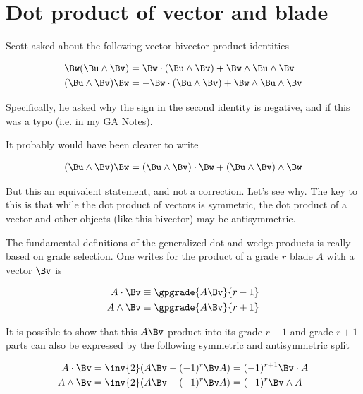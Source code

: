 

\chapter{Dot product of vector and blade}
\label{chap:dotBlade}
{}
\date{Aug 11, 2009}

\beginArtWithToc

Scott asked about the following vector bivector product identities

\begin{align}
\Bw (\Bu \wedge \Bv) &= \Bw \cdot (\Bu \wedge \Bv) + \Bw \wedge \Bu \wedge \Bv \\
(\Bu \wedge \Bv) \Bw &= - \Bw \cdot (\Bu \wedge \Bv) + \Bw \wedge \Bu \wedge \Bv
\end{align}

Specifically, he asked why the sign in the second identity is negative, and if this was a typo (\href{http://sites.google.com/site/peeterjoot/math2009/gabook.pdf}{i.e. in my GA Notes}).

It probably would have been clearer to write

\begin{align*}
(\Bu \wedge \Bv) \Bw = (\Bu \wedge \Bv) \cdot \Bw + (\Bu \wedge \Bv) \wedge \Bw
\end{align*}

But this an equivalent statement, and not a correction.  Let's see why.  The key to this is that while the dot product of vectors is symmetric, the dot product of a vector and other objects (like this bivector) may be antisymmetric.

The fundamental definitions of the generalized dot and wedge products is really based on grade selection.  One writes for the product of a grade $r$ blade $A$ with a vector $\Bv$ is

\begin{align}\label{eqn:foo4}
A \cdot \Bv &\equiv \gpgrade{A \Bv}{r-1} \\
A \wedge \Bv &\equiv \gpgrade{A \Bv}{r+1} 
\end{align}

It is possible to show that this $A \Bv$ product into its grade $r-1$ and grade $r+1$ parts can also be expressed by the following symmetric and antisymmetric split

\begin{align}\label{eqn:foo1}
A \cdot \Bv &= \inv{2} (A \Bv -(-1)^r \Bv A) = (-1)^{r+1} \Bv \cdot A \\
A \wedge \Bv &= \inv{2} (A \Bv +(-1)^r \Bv A) = (-1)^r \Bv \wedge A
\end{align}

